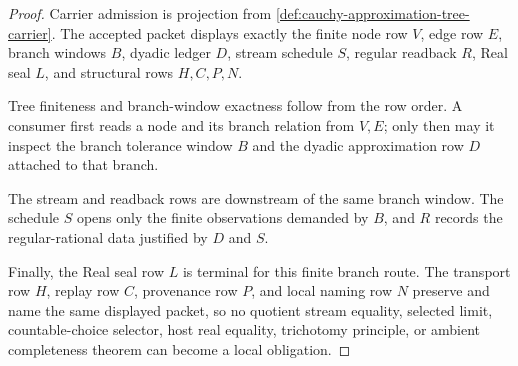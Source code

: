 \begin{proof}
Carrier admission is projection from \autoref{def:cauchy-approximation-tree-carrier}. The accepted packet displays exactly the finite node row $V$, edge row $E$, branch windows $B$, dyadic ledger $D$, stream schedule $S$, regular readback $R$, Real seal $L$, and structural rows $H,C,P,N$.

Tree finiteness and branch-window exactness follow from the row order. A consumer first reads a node and its branch relation from $V,E$; only then may it inspect the branch tolerance window $B$ and the dyadic approximation row $D$ attached to that branch.

The stream and readback rows are downstream of the same branch window. The schedule $S$ opens only the finite observations demanded by $B$, and $R$ records the regular-rational data justified by $D$ and $S$.

Finally, the Real seal row $L$ is terminal for this finite branch route. The transport row $H$, replay row $C$, provenance row $P$, and local naming row $N$ preserve and name the same displayed packet, so no quotient stream equality, selected limit, countable-choice selector, host real equality, trichotomy principle, or ambient completeness theorem can become a local obligation.
\end{proof}

